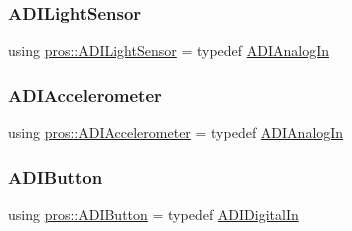\mbox{\label{namespacepros_a105b1224da9401cb8b6949713841fed7}} 
\subsubsection{\texorpdfstring{A\+D\+I\+Light\+Sensor}{ADILightSensor}}
{\footnotesize\ttfamily using \hyperlink{namespacepros_a105b1224da9401cb8b6949713841fed7}{pros\+::\+A\+D\+I\+Light\+Sensor} = typedef \hyperlink{classpros_1_1ADIAnalogIn}{A\+D\+I\+Analog\+In}}

\mbox{\label{namespacepros_afb12c694dcb91a1aa04a6ba7cfd9b6c0}} 
\subsubsection{\texorpdfstring{A\+D\+I\+Accelerometer}{ADIAccelerometer}}
{\footnotesize\ttfamily using \hyperlink{namespacepros_afb12c694dcb91a1aa04a6ba7cfd9b6c0}{pros\+::\+A\+D\+I\+Accelerometer} = typedef \hyperlink{classpros_1_1ADIAnalogIn}{A\+D\+I\+Analog\+In}}

\mbox{\label{namespacepros_a00d5ba20a966a15bf0276ffda24f2dcf}} 
\subsubsection{\texorpdfstring{A\+D\+I\+Button}{ADIButton}}
{\footnotesize\ttfamily using \hyperlink{namespacepros_a00d5ba20a966a15bf0276ffda24f2dcf}{pros\+::\+A\+D\+I\+Button} = typedef \hyperlink{classpros_1_1ADIDigitalIn}{A\+D\+I\+Digital\+In}}

